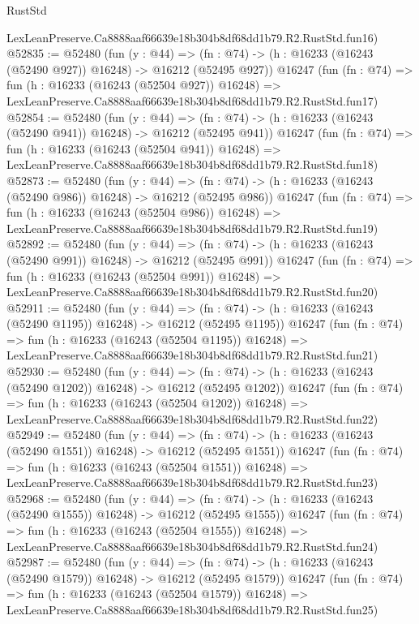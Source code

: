 \begin{lexlean}{RustStd}
\begin{coremodule}
    LexLeanPreserve.Ca8888aaf66639e18b304b8df68dd1b79.R2.RustStd.fun16)
@52835 := @52480
    (fun (y : @44) =>
    (fn : @74) -> (h : @16233 (@16243 (@52490 @927)) @16248) -> @16212 (@52495 @927))
    @16247
    (fun (fn : @74) =>
    fun (h : @16233 (@16243 (@52504 @927)) @16248) =>
    LexLeanPreserve.Ca8888aaf66639e18b304b8df68dd1b79.R2.RustStd.fun17)
@52854 := @52480
    (fun (y : @44) =>
    (fn : @74) -> (h : @16233 (@16243 (@52490 @941)) @16248) -> @16212 (@52495 @941))
    @16247
    (fun (fn : @74) =>
    fun (h : @16233 (@16243 (@52504 @941)) @16248) =>
    LexLeanPreserve.Ca8888aaf66639e18b304b8df68dd1b79.R2.RustStd.fun18)
@52873 := @52480
    (fun (y : @44) =>
    (fn : @74) -> (h : @16233 (@16243 (@52490 @986)) @16248) -> @16212 (@52495 @986))
    @16247
    (fun (fn : @74) =>
    fun (h : @16233 (@16243 (@52504 @986)) @16248) =>
    LexLeanPreserve.Ca8888aaf66639e18b304b8df68dd1b79.R2.RustStd.fun19)
@52892 := @52480
    (fun (y : @44) =>
    (fn : @74) -> (h : @16233 (@16243 (@52490 @991)) @16248) -> @16212 (@52495 @991))
    @16247
    (fun (fn : @74) =>
    fun (h : @16233 (@16243 (@52504 @991)) @16248) =>
    LexLeanPreserve.Ca8888aaf66639e18b304b8df68dd1b79.R2.RustStd.fun20)
@52911 := @52480
    (fun (y : @44) =>
    (fn : @74) -> (h : @16233 (@16243 (@52490 @1195)) @16248) -> @16212 (@52495 @1195))
    @16247
    (fun (fn : @74) =>
    fun (h : @16233 (@16243 (@52504 @1195)) @16248) =>
    LexLeanPreserve.Ca8888aaf66639e18b304b8df68dd1b79.R2.RustStd.fun21)
@52930 := @52480
    (fun (y : @44) =>
    (fn : @74) -> (h : @16233 (@16243 (@52490 @1202)) @16248) -> @16212 (@52495 @1202))
    @16247
    (fun (fn : @74) =>
    fun (h : @16233 (@16243 (@52504 @1202)) @16248) =>
    LexLeanPreserve.Ca8888aaf66639e18b304b8df68dd1b79.R2.RustStd.fun22)
@52949 := @52480
    (fun (y : @44) =>
    (fn : @74) -> (h : @16233 (@16243 (@52490 @1551)) @16248) -> @16212 (@52495 @1551))
    @16247
    (fun (fn : @74) =>
    fun (h : @16233 (@16243 (@52504 @1551)) @16248) =>
    LexLeanPreserve.Ca8888aaf66639e18b304b8df68dd1b79.R2.RustStd.fun23)
@52968 := @52480
    (fun (y : @44) =>
    (fn : @74) -> (h : @16233 (@16243 (@52490 @1555)) @16248) -> @16212 (@52495 @1555))
    @16247
    (fun (fn : @74) =>
    fun (h : @16233 (@16243 (@52504 @1555)) @16248) =>
    LexLeanPreserve.Ca8888aaf66639e18b304b8df68dd1b79.R2.RustStd.fun24)
@52987 := @52480
    (fun (y : @44) =>
    (fn : @74) -> (h : @16233 (@16243 (@52490 @1579)) @16248) -> @16212 (@52495 @1579))
    @16247
    (fun (fn : @74) =>
    fun (h : @16233 (@16243 (@52504 @1579)) @16248) =>
    LexLeanPreserve.Ca8888aaf66639e18b304b8df68dd1b79.R2.RustStd.fun25)

\end{coremodule}
\end{lexlean}
